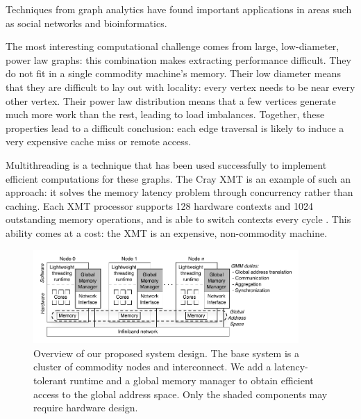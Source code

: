\documentclass[10pt,nocopyrightspace,preprint]{sigplanconf}
\begin{document}
Techniques from graph analytics have found important applications in
areas such as social networks and bioinformatics. 




The most interesting computational challenge comes from large,
low-diameter, power law graphs: this combination makes extracting
performance difficult. They do not fit in a single
commodity machine's memory. Their low diameter means that they are
difficult to lay out with locality: every vertex needs to be near every
other vertex. Their power law distribution means that a few vertices
generate much more work than the rest, leading to load
imbalances. Together, these properties lead to a
difficult conclusion: each edge traversal is likely to induce a very
expensive cache miss or remote access.

Multithreading is a technique that has been used successfully to
implement efficient computations for these graphs. The Cray XMT is an
example of such an approach: it solves the memory latency problem
through concurrency rather than caching. Each XMT processor supports
128 hardware contexts and 1024 outstanding memory operations, and is
able to switch contexts every cycle . This ability comes at a cost: the
XMT is an expensive, non-commodity machine. 


\begin{figure}[htbp]
  \begin{center}
    \includegraphics[width=0.9\textwidth]{figures/system-overview.pdf}
	\end{center}
	\caption{Overview of our proposed system design. The base
          system is a cluster of commodity nodes and interconnect. We
          add a latency-tolerant runtime and a global memory manager
          to obtain efficient access to the global address space. Only
          the shaded components may require hardware design.}
	\label{fig:system-overview}
\end{figure}
\end{document}
